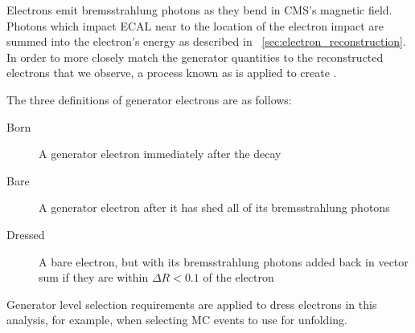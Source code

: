 Electrons emit bremsstrahlung photons as they bend in CMS's magnetic field.
Photons which impact ECAL near to the location of the electron impact are
summed into the electron's energy as described in
\SEC~\ref{sec:electron_reconstruction}. In order to more closely match the
generator quantities to the reconstructed electrons that we observe, a process
known as \dressing is applied to create \dressedelectrons.

The three definitions of generator electrons are as follows:

\begin{description}
    \item[Born] A generator electron immediately after the \Ztoee decay
    \item[Bare] A generator electron after it has shed all of its
        bremsstrahlung photons
    \item[Dressed] A bare electron, but with its bremsstrahlung photons added
        back in vector sum if they are within $\Delta R < 0.1$ of the electron
\end{description}

Generator level selection requirements are applied to dress electrons in this
analysis, for example, when selecting MC events to use for unfolding.
